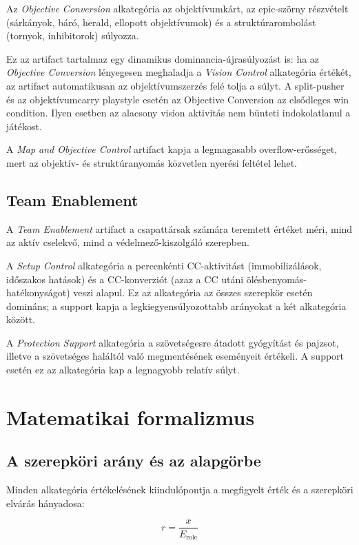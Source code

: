 Az \emph{Objective Conversion} alkategória az objektívumkárt, az epic-szörny részvételt (sárkányok, báró, herald, ellopott objektívumok) és a struktúrarombolást (tornyok, inhibitorok) súlyozza.

Ez az artifact tartalmaz egy dinamikus dominancia-újrasúlyozást is: ha az \emph{Objective Conversion} lényegesen meghaladja a \emph{Vision Control} alkategória értékét, az artifact automatikusan az objektívumszerzés felé tolja a súlyt. A split-pusher és az objektívumcarry playstyle esetén az Objective Conversion az elsődleges win condition. Ilyen esetben az alacsony vision aktivitás nem bünteti indokolatlanul a játékost.

A \textit{Map and Objective Control} artifact kapja a legmagasabb overflow-erősséget, mert az objektív- és struktúranyomás közvetlen nyerési feltétel lehet.

\subsection{Team Enablement}

A \textit{Team Enablement} artifact a csapattársak számára teremtett értéket méri, mind az aktív cselekvő, mind a védelmező-kiszolgáló szerepben.

A \emph{Setup Control} alkategória a percenkénti CC-aktivitást (immobilizálások, időszakos hatások) és a CC-konverziót (azaz a CC utáni ölésbenyomás-hatékonyságot) veszi alapul. Ez az alkategória az összes szerepkör esetén domináns; a support kapja a legkiegyensúlyozottabb arányokat a két alkategória között.

A \emph{Protection Support} alkategória a szövetségesre átadott gyógyítást és pajzsot, illetve a szövetséges haláltól való megmentésének eseményeit értékeli. A support esetén ez az alkategória kap a legnagyobb relatív súlyt.

\section{Matematikai formalizmus}

\subsection{A szerepköri arány és az alapgörbe}

Minden alkategória értékelésének kiindulópontja a megfigyelt érték és a szerepköri elvárás hányadosa:

\begin{equation}
r = \frac{x}{E_{\text{role}}}
\end{equation}

